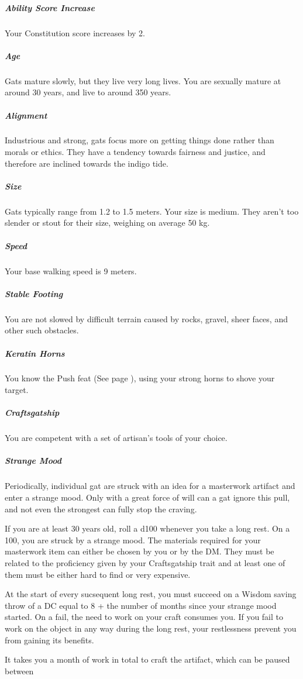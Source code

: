     \subparagraph{Ability Score Increase} Your Constitution score increases by 2.

    \subparagraph{Age} Gats mature slowly, but they live very long lives.
    You are sexually mature at around 30 years, and live to around 350 years.

    \subparagraph{Alignment} Industrious and strong, gats focus more on getting things done rather than morals or ethics.
    They have a tendency towards fairness and justice, and therefore are inclined towards the indigo tide.

    \subparagraph{Size} Gats typically range from 1.2 to 1.5 meters.
    Your size is medium.
    They aren't too slender or stout for their size, weighing on average 50 kg.

    \subparagraph{Speed} Your base walking speed is 9 meters.

    \subparagraph{Stable Footing} You are not slowed by difficult terrain caused by rocks, gravel, sheer faces, and other such obstacles.

    \subparagraph{Keratin Horns} You know the Push feat (See page \pageref{feat::push}), using your strong horns to shove your target.

    \subparagraph{Craftsgatship} You are competent with a set of artisan's tools of your choice.

    \subparagraph{Strange Mood} Periodically, individual gat are struck with an idea for a masterwork artifact and enter a strange mood.
    Only with a great force of will can a gat ignore this pull, and not even the strongest can fully stop the craving.

    If you are at least 30 years old, roll a d100 whenever you take a long rest.
    On a 100, you are struck by a strange mood.
    The materials required for your masterwork item can either be chosen by you or by the DM.
    They must be related to the proficiency given by your Craftsgatship trait and at least one of them must be either hard to find or very expensive.

    At the start of every sucsequent long rest, you must succeed on a Wisdom saving throw of a DC equal to 8 + the number of months since your strange mood started.
    On a fail, the need to work on your craft consumes you.
    If you fail to work on the object in any way during the long rest, your restlessness prevent you from gaining its benefits.

    It takes you a month of work in total to craft the artifact, which can be paused between

